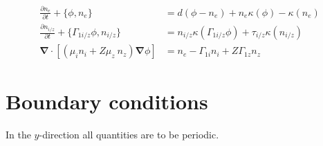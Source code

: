 \documentclass[a4paper,12pt]{scrartcl}
\renewcommand{\vec}[1]{{\mathbf{#1}}}
\begin{document}
\begin{subequations}
    \begin{align}
    \frac{\partial n_e}{\partial t} + \{\phi, n_e\} &= d( \phi - n_e) + n_e\kappa(\phi) -
    \kappa(n_e) \\
    \frac{\partial n_{i/z}}{\partial t} + \{\Gamma_{1i/z}\phi, n_{i/z}\} &= 
    n_{i/z}\kappa(\Gamma_{1i/z}\phi) + \tau_{i/z}\kappa(n_{i/z}) \\
    \vec \nabla\cdot\left[ (\mu_i n_i + Z \mu_z\ n_z)\vec \nabla \phi \right] &= 
        n_e - \Gamma_{1i}n_i + Z \Gamma_{1z} n_z
        \label{}
    \end{align}
    \label{}
\end{subequations}

\section{Boundary conditions}
In the $y$-direction all quantities are to be periodic.
\end{document}
